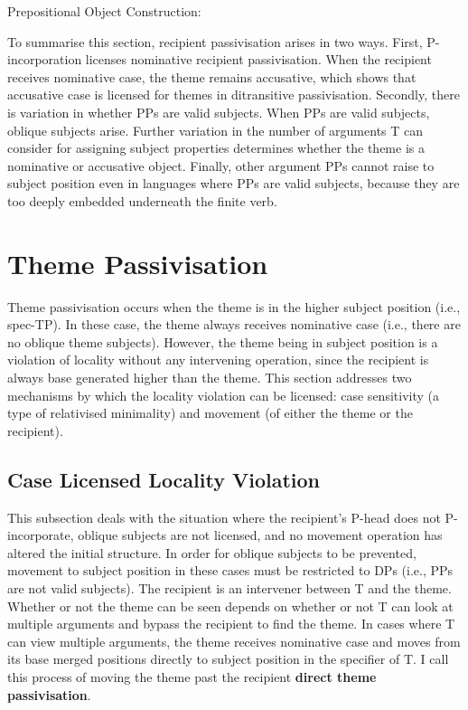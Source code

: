 \begin{exe}
	 Prepositional Object Construction: \\
\end{exe}

To summarise this section, recipient passivisation arises in two ways. First, P-incorporation licenses nominative recipient passivisation. When the recipient receives nominative case, the theme remains accusative, which shows that accusative case is licensed for themes in ditransitive passivisation. Secondly, there is variation in whether PPs are valid subjects. When PPs are valid subjects, oblique subjects arise. Further variation in the number of arguments T can consider for assigning subject properties determines whether the theme is a nominative or accusative object. Finally, other argument PPs cannot raise to subject position even in languages where PPs are valid subjects, because they are too deeply embedded underneath the finite verb.

\section{Theme Passivisation}
Theme passivisation occurs when the theme is in the higher subject position (i.e., spec-TP). In these case, the theme always receives nominative case (i.e., there are no oblique theme subjects). However, the theme being in subject position is a violation of locality without any intervening operation, since the recipient is always base generated higher than the theme. This section addresses two mechanisms by which the locality violation can be licensed: case sensitivity (a type of relativised minimality) and movement (of either the theme or the recipient).

\subsection{Case Licensed Locality Violation}
This subsection deals with the situation where the recipient's P-head does not P-incorporate, oblique subjects are not licensed, and no movement operation has altered the initial structure. In order for oblique subjects to be prevented, movement to subject position in these cases must be restricted to DPs (i.e., PPs are not valid subjects). The recipient is an intervener between T and the theme. Whether or not the theme can be seen depends on whether or not T can look at multiple arguments and bypass the recipient to find the theme. In cases where T can view multiple arguments, the theme receives nominative case and moves from its base merged positions directly to subject position in the specifier of T. I call this process of moving the theme past the recipient \textbf{direct theme passivisation}.

